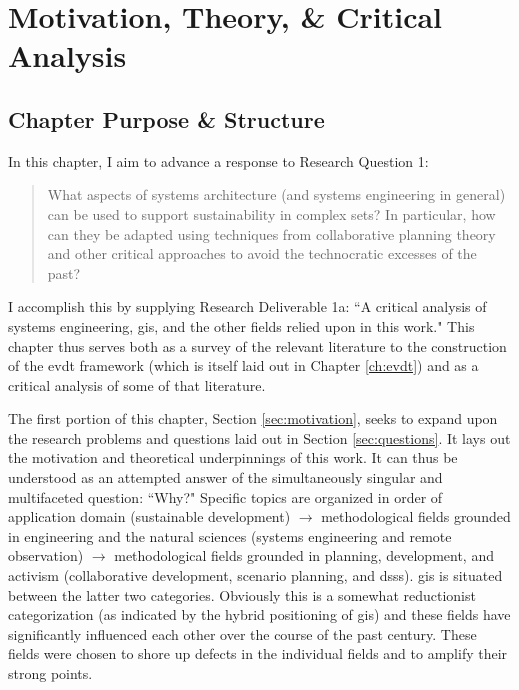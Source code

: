 
\chapter{Motivation, Theory,  \& Critical Analysis} \label{ch:theory}

\section{Chapter Purpose \& Structure}

In this chapter, I aim to advance a response to Research Question 1: 

\blockquote{What aspects of systems architecture (and systems engineering in general) can be used to support sustainability in complex \ac{sets}? In particular, how can they be adapted using techniques from collaborative planning theory and other critical approaches to avoid the technocratic excesses of the past?}

I accomplish this by supplying Research Deliverable 1a: ``A critical analysis of systems engineering, \acf{gis}, and the other fields relied upon in this work." This chapter thus serves both as a survey of the relevant literature to the construction of the \acf{evdt} framework (which is itself laid out in Chapter \ref{ch:evdt}) and as a critical analysis of some of that literature.

The first portion of this chapter, Section \ref{sec:motivation}, seeks to expand upon the research problems and questions laid out in Section \ref{sec:questions}. It lays out the motivation and theoretical underpinnings of this work. It can thus be understood as an attempted answer of the simultaneously singular and multifaceted question: ``Why?" Specific topics are organized in order of application domain (sustainable development) $\rightarrow$ methodological fields grounded in engineering and the natural sciences (systems engineering and remote observation) $\rightarrow$ methodological fields grounded in planning, development, and activism (collaborative development, scenario planning, and \acfp{dss}). \ac{gis} is situated between the latter two categories. Obviously this is a somewhat reductionist categorization (as indicated by the hybrid positioning of \ac{gis}) and these fields have significantly influenced each other over the course of the past century. These fields were chosen to shore up defects in the individual fields and to amplify their strong points. 


